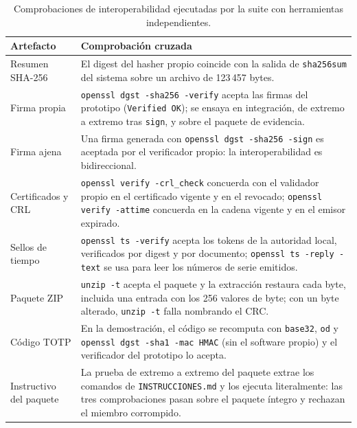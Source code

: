 \begin{table}[H]
  \centering
  \caption{Comprobaciones de interoperabilidad ejecutadas por la suite con herramientas independientes.}
  \label{tab:pruebas-interop}
  \begin{tabularx}{\linewidth}{@{}L{3.6cm} X@{}}
    \toprule
    \textbf{Artefacto} & \textbf{Comprobación cruzada} \\
    \midrule
    Resumen SHA-256 & El digest del hasher propio coincide con la salida de \texttt{sha256sum} del sistema sobre un archivo de 123\,457 bytes. \\
    \addlinespace
    Firma propia & \texttt{openssl dgst -sha256 -verify} acepta las firmas del prototipo (\texttt{Verified OK}); se ensaya en integración, de extremo a extremo tras \texttt{sign}, y sobre el paquete de evidencia. \\
    \addlinespace
    Firma ajena & Una firma generada con \texttt{openssl dgst -sha256 -sign} es aceptada por el verificador propio: la interoperabilidad es bidireccional. \\
    \addlinespace
    Certificados y CRL & \texttt{openssl verify -crl\_check} concuerda con el validador propio en el certificado vigente y en el revocado; \texttt{openssl verify -attime} concuerda en la cadena vigente y en el emisor expirado. \\
    \addlinespace
    Sellos de tiempo & \texttt{openssl ts -verify} acepta los tokens de la autoridad local, verificados por digest y por documento; \texttt{openssl ts -reply -text} se usa para leer los números de serie emitidos. \\
    \addlinespace
    Paquete ZIP & \texttt{unzip -t} acepta el paquete y la extracción restaura cada byte, incluida una entrada con los 256 valores de byte; con un byte alterado, \texttt{unzip -t} falla nombrando el CRC. \\
    \addlinespace
    Código TOTP & En la demostración, el código se recomputa con \texttt{base32}, \texttt{od} y \texttt{openssl dgst -sha1 -mac HMAC} (sin el software propio) y el verificador del prototipo lo acepta. \\
    \addlinespace
    Instructivo del paquete & La prueba de extremo a extremo del paquete extrae los comandos de \texttt{INSTRUCCIONES.md} y los ejecuta literalmente: las tres comprobaciones pasan sobre el paquete íntegro y rechazan el miembro corrompido. \\
    \bottomrule
  \end{tabularx}
\end{table}

